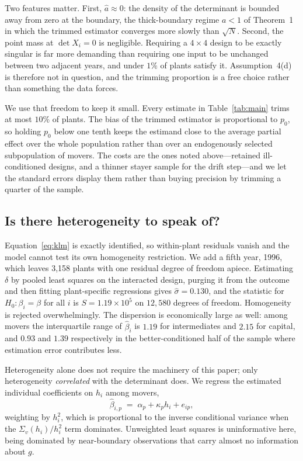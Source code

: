 Two features matter. First, $\hat a \approx 0$: the density of the determinant
is bounded away from zero at the boundary, the thick-boundary regime $a < 1$ of
Theorem~1 in which the trimmed estimator converges more slowly than $\sqrt N$.
Second, the point mass at $\det X_i = 0$ is negligible. Requiring a
$4 \times 4$ design to be exactly singular is far more demanding than requiring
one input to be unchanged between two adjacent years, and under $1\%$ of plants
satisfy it. Assumption~4(d) is therefore not in question, and the trimming
proportion is a free choice rather than something the data forces.

We use that freedom to keep it small. Every estimate in Table~\ref{tab:main}
trims at most $10\%$ of plants. The bias of the trimmed estimator is
proportional to $p_0$, so holding $p_0$ below one tenth keeps the estimand
close to the average partial effect over the whole population rather than over
an endogenously selected subpopulation of movers. The costs are the ones noted
above---retained ill-conditioned designs, and a thinner stayer sample for the
drift step---and we let the standard errors display them rather than buying
precision by trimming a quarter of the sample.

\subsection{Is there heterogeneity to speak of?}

Equation~\eqref{eq:klm} is exactly identified, so within-plant residuals vanish
and the model cannot test its own homogeneity restriction. We add a fifth year,
1996, which leaves 3{,}158 plants with one residual degree of freedom apiece.
Estimating $\delta$ by pooled least squares on the interacted design, purging
it from the outcome and then fitting plant-specific regressions gives
$\hat\sigma = 0.130$, and the \citet{Swamy1970} statistic for
$H_0: \beta_i = \beta$ for all $i$ is $S = 1.19 \times 10^{5}$ on $12{,}580$
degrees of freedom. Homogeneity is rejected overwhelmingly. The dispersion is
economically large as well: among movers the interquartile range of
$\hat\beta_i$ is $1.19$ for intermediates and $2.15$ for capital, and $0.93$
and $1.39$ respectively in the better-conditioned half of the sample where
estimation error contributes less.

Heterogeneity alone does not require the machinery of this paper; only
heterogeneity \emph{correlated} with the determinant does. We regress the
estimated individual coefficients on $h_i$ among movers,
\begin{equation}
  \hat\beta_{i,p} \;=\; \alpha_p + \kappa_p h_i + e_{ip},
  \label{eq:kappa}
\end{equation}
weighting by $h_i^2$, which is proportional to the inverse conditional variance
when the $\Sigma_v(h_i)/h_i^{2}$ term dominates. Unweighted least squares is
uninformative here, being dominated by near-boundary observations that carry
almost no information about $g$.

